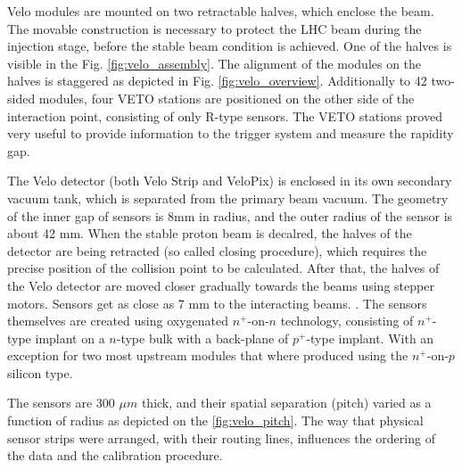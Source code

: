 Velo modules are mounted on two retractable halves, which enclose the beam. The movable construction is necessary to protect the LHC beam during the injection stage, before the stable beam condition is achieved.
One of the halves is visible in the Fig. \ref{fig:velo_assembly}.
The alignment of the modules on the halves is staggered as depicted in Fig. \ref{fig:velo_overview}.
Additionally to 42 two-sided modules, four VETO stations are positioned on the other side of the interaction point, consisting of only R-type sensors. The VETO stations proved very useful to provide information to the trigger system and measure the rapidity gap.

The Velo detector (both Velo Strip and VeloPix) is enclosed in its own secondary vacuum tank, which is separated from the primary beam vacuum.
The geometry of the inner gap of sensors is 8mm in radius, and the outer radius of the sensor is about 42 mm.
When the stable proton beam is decalred, the halves of the detector are being retracted (so called closing procedure), which requires the precise position of the collision point to be calculated.
After that, the halves of the Velo detector are moved closer gradually towards the beams using stepper
motors. Sensors get as close as 7 mm to the interacting beams. \cite{Aaij:1707015}.
The sensors themselves are created using oxygenated $n^{+}$-on-$n$ technology, consisting of $n^{+}$-type implant on a $n$-type bulk with a back-plane of $p^{+}$-type implant.
With an exception for two most upstream modules that where produced using the $n^{+}$-on-$p$ silicon type.

The sensors are 300 $\mu m$ thick, and their spatial separation (pitch) varied as a function of radius \cite{Barbosa-Marinho:504321} as depicted on the \ref{fig:velo_pitch}. The way that physical sensor strips were arranged, with their routing lines, influences the ordering of the data and the calibration procedure.

